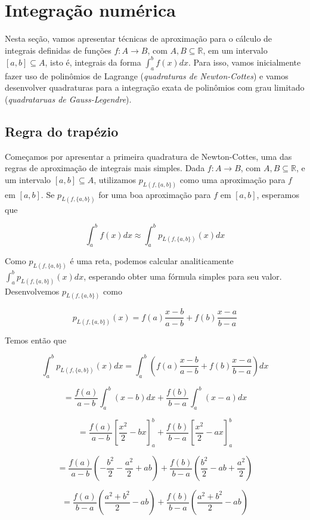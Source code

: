 \documentclass[]{article}
\numberwithin{equation}{section}
\begin{document}
\section{Integração numérica}

Nesta seção, vamos apresentar técnicas de aproximação para o cálculo de integrais definidas de funções $f : A \to B$, com $A, B \subseteq \mathbb{R}$, em um intervalo $[a, b] \subseteq A$, isto é, integrais da forma $\int_a^b f(x) dx$. Para isso, vamos inicialmente fazer uso de polinômios de Lagrange (\emph{quadraturas de Newton-Cottes}) e vamos desenvolver quadraturas para a integração exata de polinômios com grau limitado (\emph{quadrataruas de Gauss-Legendre}).

\subsection{Regra do trapézio}

Começamos por apresentar a primeira quadratura de Newton-Cottes, uma das regras de aproximação de integrais mais simples. Dada $f : A \to B$, com $A, B \subseteq \mathbb{R}$, e um intervalo $[a, b] \subseteq A$, utilizamos $p_{L(f, \{a, b\})}$ como uma aproximação para $f$ em $[a, b]$. Se $p_{L(f, \{a, b\})}$ for uma boa aproximação para $f$ em $[a, b]$, esperamos que

$$
\int_{a}^{b} f(x) dx \approx \int_{a}^{b} p_{L(f, \{a, b\})}(x) dx
$$

Como $p_{L(f, \{a, b\})}$ é uma reta, podemos calcular analiticamente $\int_{a}^{b} p_{L(f, \{a, b\})}(x) dx$, esperando obter uma fórmula simples para seu valor. Desenvolvemos $p_{L(f, \{a, b\})}$ como

$$
p_{L(f, \{a, b\})}(x) = f(a) \frac{x - b}{a - b} + f(b) \frac{x - a}{b - a}
$$

Temos então que

$$
\int_{a}^{b} p_{L(f, \{a, b\})}(x) dx = \int_{a}^{b} \left(f(a) \frac{x - b}{a - b} + f(b) \frac{x - a}{b - a}\right) dx
$$

$$
= \frac{f(a)}{a - b} \int_{a}^{b} (x - b) dx + \frac{f(b)}{b - a} \int_{a}^{b} (x - a) dx
$$

$$
= \frac{f(a)}{a - b} \left[\frac{x^2}{2} - bx\right]_a^b + \frac{f(b)}{b - a} \left[\frac{x^2}{2} - ax\right]_a^b
$$

$$
= \frac{f(a)}{a - b} \left(-\frac{b^2}{2} - \frac{a^2}{2} + ab\right) + \frac{f(b)}{b - a} \left(\frac{b^2}{2} - ab + \frac{a^2}{2}\right)
$$

$$
= \frac{f(a)}{b - a} \left(\frac{a^2 + b^2}{2} - ab\right) + \frac{f(b)}{b - a} \left(\frac{a^2 + b^2}{2} - ab\right)
$$
\end{document}
